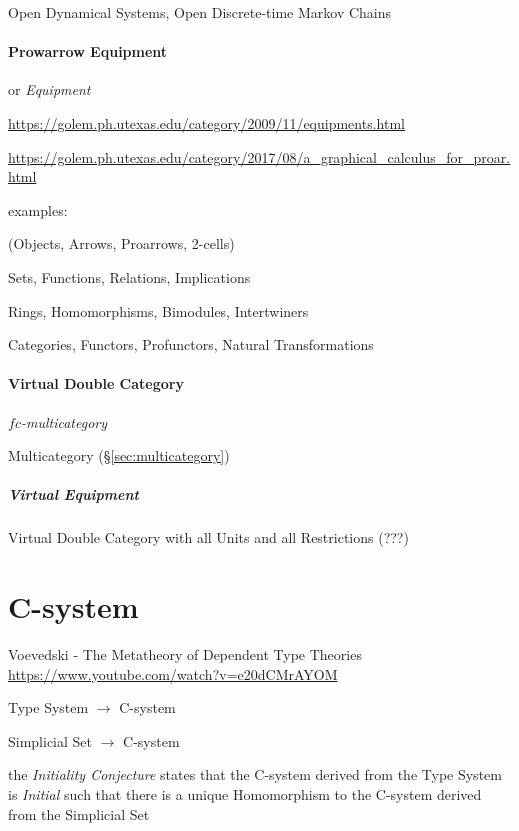 Open Dynamical Systems, Open Discrete-time Markov Chains



\paragraph{Prowarrow Equipment}\label{sec:proarrow_equipment}\hfill

or \emph{Equipment}

\url{https://golem.ph.utexas.edu/category/2009/11/equipments.html}

\url{https://golem.ph.utexas.edu/category/2017/08/a_graphical_calculus_for_proar.html}

examples:

(Objects, Arrows, Proarrows, 2-cells)

Sets, Functions, Relations, Implications

Rings, Homomorphisms, Bimodules, Intertwiners

Categories, Functors, Profunctors, Natural Transformations



\paragraph{Virtual Double Category}\label{sec:virtual_double_category}\hfill

\emph{$fc$-multicategory}

Multicategory (\S\ref{sec:multicategory})



\subparagraph{Virtual Equipment}\label{sec:virtual_equipment}\hfill

Virtual Double Category with all Units and all Restrictions (???)



\section{C-system}\label{sec:c_system}

Voevedski - The Metatheory of Dependent Type Theories
\url{https://www.youtube.com/watch?v=e20dCMrAYOM}

Type System $\rightarrow$ C-system

Simplicial Set $\rightarrow$ C-system

the \emph{Initiality Conjecture} states that the C-system derived from
the Type System is \emph{Initial} such that there is a unique
Homomorphism to the C-system derived from the Simplicial Set



